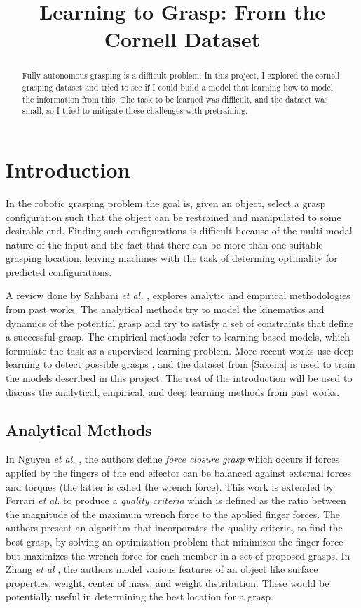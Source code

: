 \documentclass{article}
\title{Learning to Grasp: From the Cornell Dataset}
\begin{document}
\maketitle

\begin{abstract}
Fully autonomous grasping is a difficult problem. In this project, I explored
the cornell grasping dataset and tried to see if I could build a model that
learning how to model the information from this. The task to be learned was
difficult, and the dataset was small, so I tried to mitigate these challenges
with pretraining.
\end{abstract}

\section{Introduction}
In the robotic grasping problem the goal is, given an object, select a grasp
configuration such that the object can be restrained and
manipulated to some desirable end. Finding such configurations is difficult
because of the multi-modal nature of the input and the fact that there can be
more than one suitable grasping location, leaving machines with the task
of determing optimality for predicted configurations.

A review done by Sahbani \textit{et al.} \cite{sahbani12}, explores analytic and empirical
methodologies from past works. The analytical
methods try to model the kinematics and dynamics of the potential grasp and try to
satisfy a set of constraints that define a successful grasp.
The empirical methods refer to learning based models, which formulate the
task as a
supervised learning problem. More recent works use deep learning to detect
possible grasps \cite{lenz15,zhang18,zhou18}, and the dataset from [Saxena]
is used to train the models described in this project. The rest of the
introduction will be used to discuss the analytical, empirical, and deep learning
methods from past works.

\subsection{Analytical Methods}
In Nguyen \textit{et al.} \cite{nguyen86}, the authors define
\textit{force closure grasp}
which occurs if forces applied by the fingers of the end
effector can be balanced against external forces and torques
(the latter is called the wrench force). This work is extended by Ferrari
\textit{et al.} \cite{ferrari92} to produce a \textit{quality criteria}
which is defined as
the ratio between the magnitude of the maximum wrench force to the
applied finger forces. The authors present an algorithm that incorporates the
quality criteria, to find the best grasp, by solving an optimization problem
that minimizes the finger force but maximizes the wrench force for each member
in a set of proposed grasps. In Zhang \textit{et al} \cite{zhang12}, the authors
model various features of an object like surface properties, weight, center
of mass, and weight distribution. These would be potentially useful in
determining the best location for a grasp.
\end{document}
